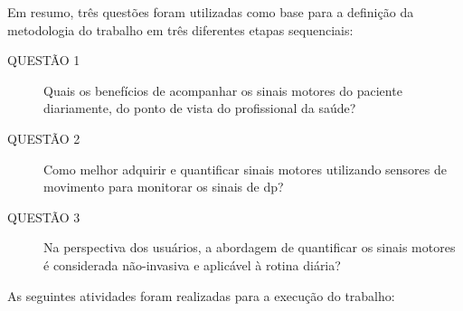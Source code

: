 Em resumo, três questões foram utilizadas como base para a definição da metodologia do trabalho em três diferentes etapas sequenciais:
	\begin{description}
	\item[QUESTÃO 1] Quais os benefícios de acompanhar os sinais motores do paciente diariamente, do ponto de vista do profissional da saúde?
	\item[QUESTÃO 2] Como melhor adquirir e quantificar sinais motores utilizando sensores de movimento para monitorar os sinais de \ac{dp}?
	\item[QUESTÃO 3] Na perspectiva dos usuários, a abordagem de quantificar os sinais motores é considerada não-invasiva e aplicável à rotina diária?
	\end{description}

As seguintes atividades foram realizadas para a execução do trabalho:

